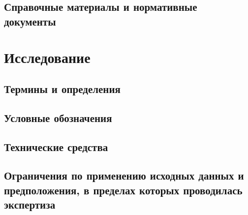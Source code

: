 \documentclass[a4paper,12pt,english,notitlepage]{report}
\begin{document}
\subsection{Справочные материалы и нормативные документы}



\section{Исследование}


\subsection{Термины и определения}


\subsection{Условные обозначения}


\subsection{Технические средства}


\subsection{Ограничения по применению исходных данных и предположения, в пределах которых проводилась экспертиза}








\end{document}
